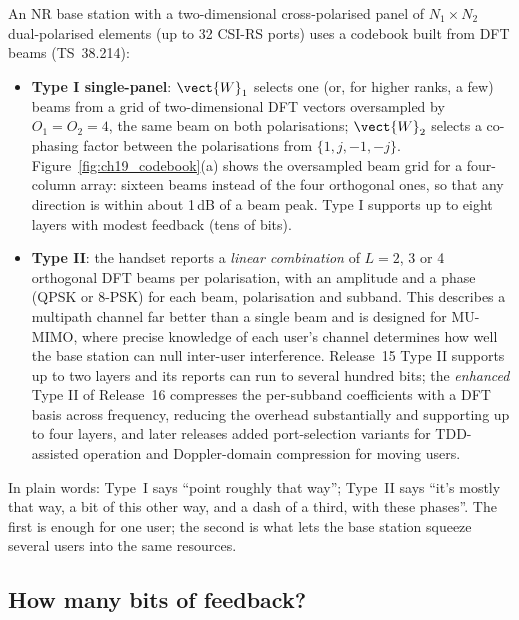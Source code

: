 An NR base station with a two-dimensional cross-polarised panel of $N_1\times N_2$ dual-polarised
elements (up to 32 CSI-RS ports) uses a codebook built from DFT beams (TS~38.214):
\begin{itemize}
\item \textbf{Type I single-panel}: $\vect{W}_1$ selects one (or, for higher ranks, a few) beams from
a grid of two-dimensional DFT vectors oversampled by $O_1=O_2=4$, the same beam on both
polarisations; $\vect{W}_2$ selects a co-phasing factor between the polarisations from
$\{1,j,-1,-j\}$. Figure~\ref{fig:ch19_codebook}(a) shows the oversampled beam grid for a
four-column array: sixteen beams instead of the four orthogonal ones, so that any direction is
within about 1\,dB of a beam peak. Type I supports up to eight layers with modest feedback (tens of bits).
\item \textbf{Type II}: the handset reports a \emph{linear combination} of $L=2$, 3 or 4 orthogonal
DFT beams per polarisation, with an amplitude and a phase (QPSK or 8-PSK) for each beam,
polarisation and subband. This describes a multipath channel far better than a single beam and is
designed for MU-MIMO, where precise knowledge of each user's channel determines how well the base
station can null inter-user interference. Release~15 Type II supports up to two layers and its
reports can run to several hundred bits; the \emph{enhanced} Type II of Release~16 compresses the
per-subband coefficients with a DFT basis across frequency, reducing the overhead substantially and
supporting up to four layers, and later releases added port-selection variants for TDD-assisted
operation and Doppler-domain compression for moving users.
\end{itemize}
In plain words: Type~I says ``point roughly that way''; Type~II says ``it's mostly that way, a
bit of this other way, and a dash of a third, with these phases''. The first is enough for one
user; the second is what lets the base station squeeze several users into the same resources.

\subsection{How many bits of feedback?}

